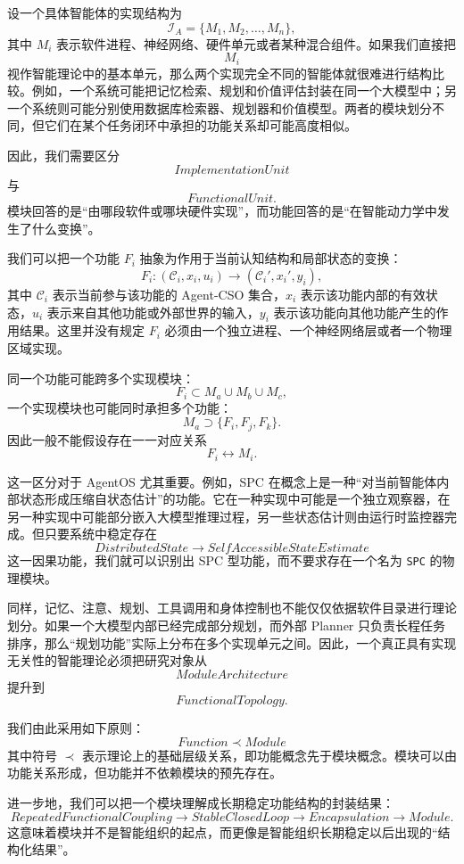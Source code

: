 设一个具体智能体的实现结构为
\[
\mathcal I_A
=
\{M_1,M_2,\ldots,M_n\},
\]
其中 $M_i$ 表示软件进程、神经网络、硬件单元或者某种混合组件。如果我们直接把
\[
M_i
\]
视作智能理论中的基本单元，那么两个实现完全不同的智能体就很难进行结构比较。例如，一个系统可能把记忆检索、规划和价值评估封装在同一个大模型中；另一个系统则可能分别使用数据库检索器、规划器和价值模型。两者的模块划分不同，但它们在某个任务闭环中承担的功能关系却可能高度相似。

因此，我们需要区分
\[
ImplementationUnit
\]
与
\[
FunctionalUnit.
\]
模块回答的是“由哪段软件或哪块硬件实现”，而功能回答的是“在智能动力学中发生了什么变换”。

我们可以把一个功能 $F_i$ 抽象为作用于当前认知结构和局部状态的变换：
\[
F_i:
(\mathcal C_i,x_i,u_i)
\longrightarrow
(\mathcal C_i',x_i',y_i),
\]
其中 $\mathcal C_i$ 表示当前参与该功能的 Agent-CSO 集合，$x_i$ 表示该功能内部的有效状态，$u_i$ 表示来自其他功能或外部世界的输入，$y_i$ 表示该功能向其他功能产生的作用结果。这里并没有规定 $F_i$ 必须由一个独立进程、一个神经网络层或者一个物理区域实现。

同一个功能可能跨多个实现模块：
\[
F_i
\subset
M_a\cup M_b\cup M_c,
\]
一个实现模块也可能同时承担多个功能：
\[
M_a
\supset
\{F_i,F_j,F_k\}.
\]
因此一般不能假设存在一一对应关系
\[
F_i\leftrightarrow M_i.
\]

这一区分对于 AgentOS 尤其重要。例如，SPC 在概念上是一种“对当前智能体内部状态形成压缩自状态估计”的功能。它在一种实现中可能是一个独立观察器，在另一种实现中可能部分嵌入大模型推理过程，另一些状态估计则由运行时监控器完成。但只要系统中稳定存在
\[
DistributedState
\rightarrow
SelfAccessibleStateEstimate
\]
这一因果功能，我们就可以识别出 SPC 型功能，而不要求存在一个名为 \texttt{SPC} 的物理模块。

同样，记忆、注意、规划、工具调用和身体控制也不能仅仅依据软件目录进行理论划分。如果一个大模型内部已经完成部分规划，而外部 Planner 只负责长程任务排序，那么“规划功能”实际上分布在多个实现单元之间。因此，一个真正具有实现无关性的智能理论必须把研究对象从
\[
ModuleArchitecture
\]
提升到
\[
FunctionalTopology.
\]

我们由此采用如下原则：
\[
\boxed{
Function\prec Module
}
\]
其中符号 $\prec$ 表示理论上的基础层级关系，即功能概念先于模块概念。模块可以由功能关系形成，但功能并不依赖模块的预先存在。

进一步地，我们可以把一个模块理解成长期稳定功能结构的封装结果：
\[
RepeatedFunctionalCoupling
\rightarrow
StableClosedLoop
\rightarrow
Encapsulation
\rightarrow
Module.
\]
这意味着模块并不是智能组织的起点，而更像是智能组织长期稳定以后出现的“结构化结果”。

